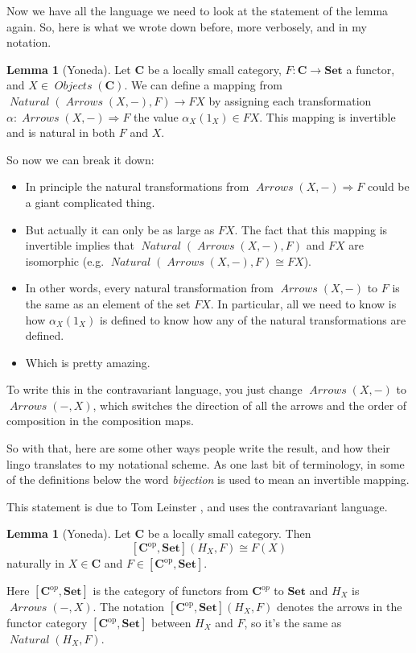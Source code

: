 \documentclass[12pt]{article}
\theoremstyle{definition}
\newtheorem{lemma}[thm]{Lemma}
\theoremstyle{definition}
\theoremstyle{definition}
\numberwithin{equation}{section}
\newcommand{\h}{H}                      %
\newcommand{\op}{\mathrm{op}}           %
\newcommand{\ftrcat}[2]{[#1,#2]}                %
\newcommand{\pshf}[1]{\ftrcat{#1^\op}{\Set}}    %
\newcommand{\cat}[1]{\mathbf{#1}}      %
\newcommand{\fcat}[1]{{\mathbf {#1}}}    %
\newcommand{\CC}{\cat{C}}
\newcommand{\CCop}{\cat{C}^{\mathrm op}}
\DeclareMathOperator{\Arrows}{\mathit{Arrows}}
\DeclareMathOperator{\Objects}{\mathit{Objects}}
\DeclareMathOperator{\Nat}{\mathit{Natural}}
\def\objc{\Objects(\cat{C})}
\newcommand{\Set}{\fcat{Set}}           %
\newcommand{\iso}{\cong}                %
\newcommand{\fto}{\Rightarrow}
\def\pg{\bigskip\goodbreak
\ni}
\def\ni{\goodbreak\noindent}
\begin{document}
Now we have all the language we need to look at the statement of the lemma again.
So, here is what we wrote down before, more verbosely, and in my notation.

\begin{lemma}[Yoneda]\label{yoneda} Let $\CC$ be a locally small category, $F:\CC \to \Set$ a functor,
and $X \in \objc$. We can define a mapping from $\Nat(\Arrows(X, -),F) \to FX$
by assigning each transformation $\alpha: \Arrows(X, -) \fto F$ 
the value $\alpha_X(1_X) \in FX$. 
This mapping is invertible and is natural in both $F$ and $X$.
\end{lemma}
\ni
So now we can break it down:
\begin{itemize}
\item In principle the natural transformations 
from $\Arrows(X, -) \fto F$ could be a giant complicated thing.
\item But actually it can only be as large as $FX$. The fact that this mapping is
invertible implies
that $\Nat(\Arrows(X, -),F)$ and  $FX$ are isomorphic (e.g. $\Nat(\Arrows(X, -),F) \iso FX$).
\item In other words, every natural transformation from $\Arrows(X, -)$ to $F$
is the same as
an element of the set $FX$. In particular, all we need to know is how 
$\alpha_X(1_X)$ is defined to know
how any of the natural transformations are defined.
\item Which is pretty amazing.
\end{itemize}
To write this in the contravariant language, you just change $\Arrows(X, -)$ to $\Arrows(-, X)$, which
switches the direction of all the arrows and the order of composition in the composition maps.

So with that, here are some other ways people write the result, and how their lingo translates to 
my notational scheme. As one last bit of terminology, in some of the definitions below 
the word {\it bijection} is used to mean an invertible mapping.

\pg
This statement is due to Tom Leinster \cite{Leinster}, and uses the contravariant language.

\begin{lemma}[Yoneda]   
\label{yoneda-leinster}
Let $\CC$ be a locally small category.  Then
%
$$
\pshf{\CC}(\h_X, F)
\iso
F(X)
$$
%
naturally in $X \in \CC$ and $F \in \pshf{\CC}$.  
\end{lemma}
\ni
Here $[\CCop, \Set]$ is the category of functors from $\CCop$ to $\Set$ and $\h_X$ is $\Arrows(-,X)$.
The notation $\pshf{\CC}(\h_X, F)$ denotes the arrows in the functor category $\pshf{\CC}$ between 
$\h_X$ and $F$, so it's the same as $\Nat(\h_X, F)$.
\end{document}
